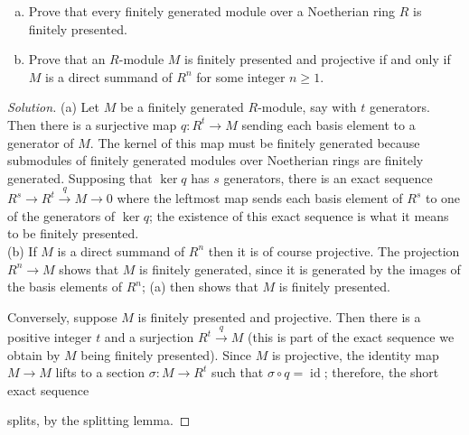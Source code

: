 \documentclass[10pt]{article}
\providecommand{\ii}{\item}
\newenvironment{soln}{\begin{proof}[Solution]}{\end{proof}}
\begin{document}
\begin{problem}
    [\S17.1\#26]
    \begin{enumerate}[(a)]
        \ii Prove that every finitely generated module
	over a Noetherian ring $R$ is finitely presented.
	\ii Prove that an $R$-module $M$ is finitely presented
	and projective if and only if $M$ is a direct summand
	of $R^n$ for some integer $n\ge 1$.
    \end{enumerate}
\end{problem}

\begin{soln}
    (a) Let $M$ be a finitely generated $R$-module,
    say with $t$ generators. Then there is a surjective map
    $q\colon R^t\to M$ sending each basis element to a generator of $M$.
    The kernel of this map must be finitely generated
    because submodules of finitely generated modules
    over Noetherian rings are finitely generated.
    Supposing that $\ker q$ has $s$ generators, there is an exact sequence
    $R^s\to R^t\overset q\to M\to 0$ where the leftmost map
    sends each basis element of $R^s$ to one of the generators of $\ker q$;
    the existence of this exact sequence is what it means
    to be finitely presented.
    \\

    (b) If $M$ is a direct summand of $R^n$ then it is of course projective.
    The projection $R^n\to M$ shows that $M$ is finitely generated,
    since it is generated by the images of the basis elements of $R^n$;
    (a) then shows that $M$ is finitely presented.

    Conversely, suppose $M$ is finitely presented and projective.
    Then there is a positive integer $t$
    and a surjection $R^t\overset q\to M$ (this is part
    of the exact sequence we obtain by $M$ being finitely presented).
    Since $M$ is projective, the identity map $M\to M$ lifts
    to a section $\sigma\colon M\to R^t$ such that
    $\sigma\circ q = \operatorname{id}$; therefore,
    the short exact sequence
    \begin{center}
    \end{center}
    splits, by the splitting lemma.
\end{soln}
\end{document}
